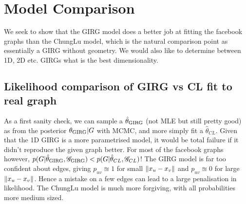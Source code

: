\section{Model Comparison}

We seek to show that the GIRG model does a better job at fitting the facebook graphs than the ChungLu model, which is the natural comparison point as essentially a GIRG without geometry. We would also like to determine between 1D, 2D etc. GIRGs what is the best dimensionality.

\subsection{Likelihood comparison of GIRG vs CL fit to real graph}
As a first sanity check, we can sample a $\hat{\theta}_{\operatorname{GIRG}}$ (not MLE but still pretty good) as from the posterior $\theta_{\operatorname{GIRG}} | G$ with MCMC, and more simply fit a $\hat{\theta}_{CL}$. Given that the 1D GIRG is a more parametrised model, it would be total failure if it didn't reproduce the given graph better. For most of the facebook graphs however, $p(G | \hat{\theta}_{\operatorname{GIRG}}, \mathscr{G}_{\operatorname{GIRG}}) < p(G | \hat{\theta}_{CL}, \mathscr{G}_{CL})$!
The GIRG model is far too confident about edges, giving $p_{uv} \approxeq 1$ for small $\left\lVert x_u - x_v\right\rVert$ and $p_{uv} \approxeq 0$ for large $\left\lVert x_u - x_v\right\rVert$. Hence a mistake on a few edges can lead to a large penalisation in likelihood. The ChungLu model is much more forgiving, with all probabilities more medium sized. 

